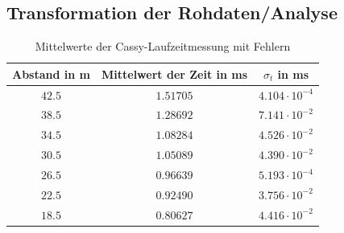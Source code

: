\documentclass[11pt]{beamer}
\begin{document}
\subsection{Transformation der Rohdaten/Analyse}
\begin{frame}
\begin{table}[H]\centering
\caption{Mittelwerte der Cassy-Laufzeitmessung mit Fehlern}
\begin{tabular}{c|c|c}
Abstand in m & Mittelwert der Zeit in ms & $\sigma_t$ in ms\\ 
\hline
$42.5$& $1.51705$& $4.104 \cdot 10^{-4}$\\ 
$38.5$& $1.28692$& $7.141 \cdot 10^{-2}$\\
$34.5$& $1.08284$& $4.526 \cdot 10^{-2}$\\
$30.5$& $1.05089$& $4.390 \cdot 10^{-2}$\\
$26.5$& $0.96639$& $5.193 \cdot 10^{-4}$\\
$22.5$& $0.92490$& $3.756 \cdot 10^{-2}$\\
$18.5$& $0.80627$& $4.416 \cdot 10^{-2}$\\
\end{tabular} 
\end{table}
\end{frame}
\end{document}
